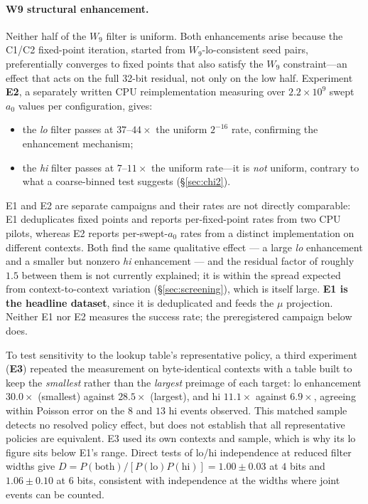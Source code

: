 \documentclass[11pt,a4paper]{article}
\begin{document}
\paragraph{W9 structural enhancement.}
Neither half of the $W_9$ filter is uniform.  Both enhancements arise because
the C1/C2 fixed-point iteration, started from $W_9$-lo-consistent seed pairs,
preferentially converges to fixed points that also satisfy the $W_9$
constraint---an effect that acts on the full 32-bit residual, not only on the
low half.  Experiment \textbf{E2}, a separately written CPU reimplementation
measuring over $2.2\times10^{9}$ swept $a_0$ values per configuration, gives:

\begin{itemize}\itemsep2pt
\item the \emph{lo} filter passes at $37$--$44\times$ the uniform $2^{-16}$
      rate, confirming the enhancement mechanism;
\item the \emph{hi} filter passes at $7$--$11\times$ the uniform rate---it
      is \emph{not} uniform, contrary to what a coarse-binned test suggests
      (\S\ref{sec:chi2}).
\end{itemize}

E1 and E2 are separate campaigns and their rates are not directly comparable:
E1 deduplicates fixed points and reports per-fixed-point rates from two CPU
pilots, whereas E2 reports per-swept-$a_0$ rates from a distinct
implementation on different contexts.  Both find the same qualitative effect
--- a large \emph{lo} enhancement and a smaller but nonzero \emph{hi}
enhancement --- and the residual factor of roughly $1.5$ between them is not
currently explained; it is within the spread expected from context-to-context
variation (\S\ref{sec:screening}), which is itself large.  \textbf{E1 is the
headline dataset}, since it is deduplicated and feeds the $\mu$ projection.
Neither E1 nor E2 measures the success rate; the preregistered campaign
below does.

To test sensitivity to the lookup table's representative policy, a third
experiment (\textbf{E3}) repeated the measurement on byte-identical
contexts with a table built to keep the \emph{smallest} rather than the
\emph{largest} preimage of each target: lo enhancement $30.0\times$
(smallest) against $28.5\times$ (largest), and hi $11.1\times$ against
$6.9\times$, agreeing within Poisson error on the $8$ and $13$ hi events
observed.  This matched sample detects no resolved policy effect, but does not
establish that all representative policies are equivalent.  E3 used its own contexts and sample, which is why its lo figure
sits below E1's range.  Direct tests of lo/hi independence at reduced filter widths give
$D = P(\text{both})/[P(\text{lo})P(\text{hi})] = 1.00\pm0.03$ at $4$ bits and
$1.06\pm0.10$ at $6$ bits, consistent with independence at the widths where
joint events can be counted.
\end{document}
